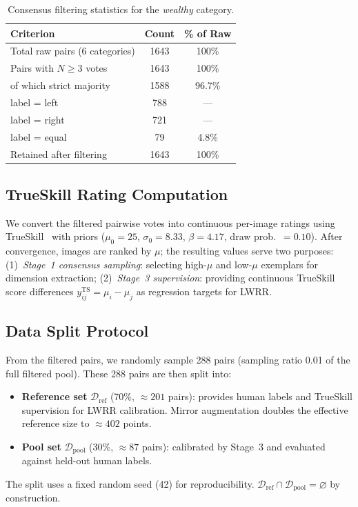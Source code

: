 \documentclass[runningheads]{llncs}
\begin{document}
\begin{table}[ht]
\centering
\caption{Consensus filtering statistics for the \emph{wealthy} category.}
\label{tab:consensus}
\small
\begin{tabular}{lcc}
\toprule
Criterion & Count & \% of Raw \\
\midrule
Total raw pairs (6 categories) & 1643 & 100\% \\
Pairs with $N \geq 3$ votes & 1643 & 100\% \\
\quad of which strict majority & 1588 & 96.7\% \\
\quad label = left & 788 & --- \\
\quad label = right & 721 & --- \\
\quad label = equal & 79 & 4.8\% \\
\midrule
Retained after filtering & 1643 & 100\% \\
\bottomrule
\end{tabular}
\end{table}

\subsection{TrueSkill Rating Computation}

We convert the filtered pairwise votes into continuous per-image ratings using TrueSkill~\cite{herbrich2006trueskill} with priors
($\mu_0{=}25$, $\sigma_0{=}8.33$, $\beta{=}4.17$, draw prob.\ $=0.10$).
After convergence, images are ranked by $\mu$; the resulting values serve two purposes:
(1)~\emph{Stage~1 consensus sampling}: selecting high-$\mu$ and low-$\mu$ exemplars for dimension extraction;
(2)~\emph{Stage~3 supervision}: providing continuous TrueSkill score differences $y^{\mathrm{TS}}_{ij} {=} \mu_i {-} \mu_j$ as regression targets for LWRR.

\subsection{Data Split Protocol}

From the filtered pairs, we randomly sample 288 pairs (sampling ratio 0.01 of the full filtered pool).
These 288 pairs are then split into:
\begin{itemize}
    \item \textbf{Reference set} $\mathcal{D}_{\mathrm{ref}}$ (70\%, ${\approx}201$ pairs): provides human labels and TrueSkill supervision for LWRR calibration.
    Mirror augmentation doubles the effective reference size to ${\approx}402$ points.
    \item \textbf{Pool set} $\mathcal{D}_{\mathrm{pool}}$ (30\%, ${\approx}87$ pairs): calibrated by Stage~3 and evaluated against held-out human labels.
\end{itemize}
The split uses a fixed random seed (42) for reproducibility.
$\mathcal{D}_{\mathrm{ref}} \cap \mathcal{D}_{\mathrm{pool}} = \varnothing$ by construction.
\end{document}
